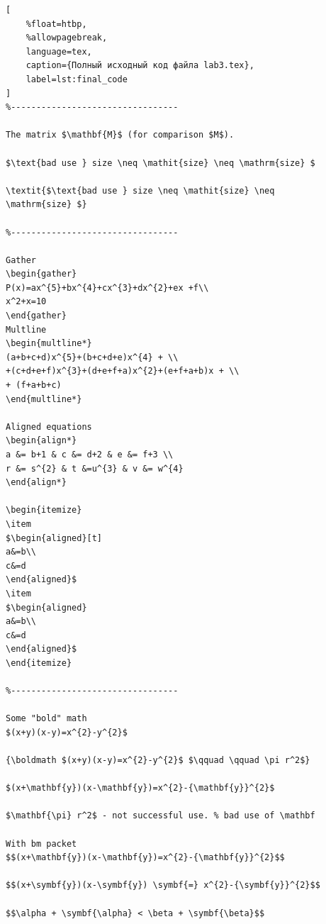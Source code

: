 \documentclass[aspectratio=169]{beamer}
\begin{document}
\begin{lstlisting}[
    %float=htbp, 
    %allowpagebreak,
    language=tex,
    caption={Полный исходный код файла lab3.tex}, 
    label=lst:final_code
]
%---------------------------------

The matrix $\mathbf{M}$ (for comparison $M$).

$\text{bad use } size \neq \mathit{size} \neq \mathrm{size} $

\textit{$\text{bad use } size \neq \mathit{size} \neq
\mathrm{size} $}

%---------------------------------

Gather
\begin{gather}
P(x)=ax^{5}+bx^{4}+cx^{3}+dx^{2}+ex +f\\
x^2+x=10
\end{gather}
Multline
\begin{multline*}
(a+b+c+d)x^{5}+(b+c+d+e)x^{4} + \\
+(c+d+e+f)x^{3}+(d+e+f+a)x^{2}+(e+f+a+b)x + \\
+ (f+a+b+c)
\end{multline*}

Aligned equations
\begin{align*}
a &= b+1 & c &= d+2 & e &= f+3 \\
r &= s^{2} & t &=u^{3} & v &= w^{4}
\end{align*}

\begin{itemize}
\item
$\begin{aligned}[t]
a&=b\\
c&=d
\end{aligned}$
\item
$\begin{aligned}
a&=b\\
c&=d
\end{aligned}$
\end{itemize}

%---------------------------------

Some "bold" math
$(x+y)(x-y)=x^{2}-y^{2}$

{\boldmath $(x+y)(x-y)=x^{2}-y^{2}$ $\qquad \qquad \pi r^2$}

$(x+\mathbf{y})(x-\mathbf{y})=x^{2}-{\mathbf{y}}^{2}$

$\mathbf{\pi} r^2$ - not successful use. % bad use of \mathbf

With bm packet
$$(x+\mathbf{y})(x-\mathbf{y})=x^{2}-{\mathbf{y}}^{2}$$

$$(x+\symbf{y})(x-\symbf{y}) \symbf{=} x^{2}-{\symbf{y}}^{2}$$

$$\alpha + \symbf{\alpha} < \beta + \symbf{\beta}$$


\end{lstlisting}
\end{document}
